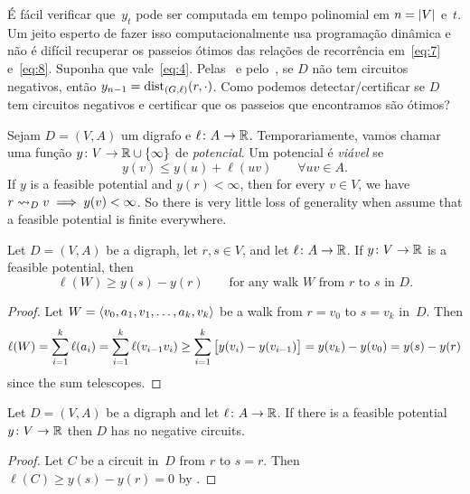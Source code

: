 \documentclass[10pt,reqno]{amsart}
\begin{document}
É fácil verificar que~\(y_t\) pode ser computada em tempo polinomial em
\(n = \card{V}\) e~\(t\). Um jeito esperto de fazer isso computacionalmente
usa programação dinâmica e não é difícil recuperar os passeios ótimos das
relações de recorrência em~\eqref{eq:7} e~\eqref{eq:8}.
Suponha que vale~\eqref{eq:4}. Pelas~
e pelo~, se \(D\) não tem circuitos negativos, então
\(y_{n-1} = \dist_{(G,\ell)}(r,\cdot)\). Como podemos detectar/certificar
se \(D\) tem circuitos negativos e certificar que os passeios que encontramos
são ótimos?

Sejam \(D = (V,A)\) um digrafo e \(\ell \colon A \to \Reals\).
Temporariamente, vamos chamar uma função
\(y \colon V \to \Reals \cup \set{\infty}\) de \emph{potencial}. Um
potencial é \emph{viável} se
\begin{equation*}
  y(v) \leq y(u) + \ell(uv) \qquad \forall uv \in A.
\end{equation*}
If \(y\) is a feasible potential and \(y(r) < \infty\), then for every
\(v \in V\), we have \(r \reaches_D v \implies y(v) < \infty\).  So
there is very little loss of generality when assume that a feasible
potential is finite everywhere.

\begin{theorem}
  \label{thm:2}
  Let \(D = (V,A)\) be a digraph, let \(r,s \in V\), and let
  \(\ell \colon A \to \Reals\).  If \(y \colon V \to \Reals\) is a
  feasible potential, then
  \begin{equation}
    \label{eq:11}
    \ell(W) \geq y(s) - y(r)
    \qquad
    \text{for any walk~\(W\) from~\(r\) to~\(s\) in~\(D\)}.
  \end{equation}
\end{theorem}
\begin{proof}
  Let \(W = \seq{v_0,a_1,v_1,\dotsc,a_k,v_k}\) be a walk from
  \(r = v_0\) to \(s = v_k\) in~\(D\).  Then
  \begin{equation*}
    \ell(W)
    =
    \sum_{i=1}^k \ell(a_i)
    =
    \sum_{i=1}^k \ell(v_{i-1}v_i)
    \geq
    \sum_{i=1}^k \sqbrac[\big]{y(v_i)-y(v_{i-1})}
    =
    y(v_k) - y(v_0)
    =
    y(s) - y(r)
  \end{equation*}
  since the sum telescopes.
\end{proof}

\begin{corollary}
  Let \(D = (V,A)\) be a digraph and let \(\ell \colon A \to \Reals\).
  If there is a feasible potential \(y \colon V \to \Reals\) then
  \(D\) has no negative circuits.
\end{corollary}
\begin{proof}
  Let \(C\) be a circuit in~\(D\) from \(r\) to \(s = r\).  Then
  \(\ell(C) \geq y(s) - y(r) = 0\) by .
\end{proof}
\end{document}
